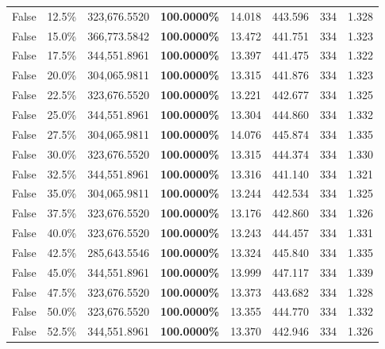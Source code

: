 \begin{table}[H]
\begin{tabular}{lllrllll}
\cline{1-8}
False & 12.5\% & 323,676.5520 & \bfseries \color{red} 100.0000\% & 14.018 & 443.596 & 334 & 1.328 \\
\cline{1-8}
False & 15.0\% & 366,773.5842 & \bfseries \color{red} 100.0000\% & 13.472 & 441.751 & 334 & 1.323 \\
\cline{1-8}
False & 17.5\% & 344,551.8961 & \bfseries \color{red} 100.0000\% & 13.397 & 441.475 & 334 & 1.322 \\
\cline{1-8}
False & 20.0\% & 304,065.9811 & \bfseries \color{red} 100.0000\% & 13.315 & 441.876 & 334 & 1.323 \\
\cline{1-8}
False & 22.5\% & 323,676.5520 & \bfseries \color{red} 100.0000\% & 13.221 & 442.677 & 334 & 1.325 \\
\cline{1-8}
False & 25.0\% & 344,551.8961 & \bfseries \color{red} 100.0000\% & 13.304 & 444.860 & 334 & 1.332 \\
\cline{1-8}
False & 27.5\% & 304,065.9811 & \bfseries \color{red} 100.0000\% & 14.076 & 445.874 & 334 & 1.335 \\
\cline{1-8}
False & 30.0\% & 323,676.5520 & \bfseries \color{red} 100.0000\% & 13.315 & 444.374 & 334 & 1.330 \\
\cline{1-8}
False & 32.5\% & 344,551.8961 & \bfseries \color{red} 100.0000\% & 13.316 & 441.140 & 334 & 1.321 \\
\cline{1-8}
False & 35.0\% & 304,065.9811 & \bfseries \color{red} 100.0000\% & 13.244 & 442.534 & 334 & 1.325 \\
\cline{1-8}
False & 37.5\% & 323,676.5520 & \bfseries \color{red} 100.0000\% & 13.176 & 442.860 & 334 & 1.326 \\
\cline{1-8}
False & 40.0\% & 323,676.5520 & \bfseries \color{red} 100.0000\% & 13.243 & 444.457 & 334 & 1.331 \\
\cline{1-8}
False & 42.5\% & \color{red} 285,643.5546 & \bfseries \color{red} 100.0000\% & 13.324 & 445.840 & 334 & 1.335 \\
\cline{1-8}
False & 45.0\% & 344,551.8961 & \bfseries \color{red} 100.0000\% & 13.999 & 447.117 & 334 & 1.339 \\
\cline{1-8}
False & 47.5\% & 323,676.5520 & \bfseries \color{red} 100.0000\% & 13.373 & 443.682 & 334 & 1.328 \\
\cline{1-8}
False & 50.0\% & 323,676.5520 & \bfseries \color{red} 100.0000\% & 13.355 & 444.770 & 334 & 1.332 \\
\cline{1-8}
False & 52.5\% & 344,551.8961 & \bfseries \color{red} 100.0000\% & 13.370 & 442.946 & 334 & 1.326 \\

\end{tabular}
\end{table}
